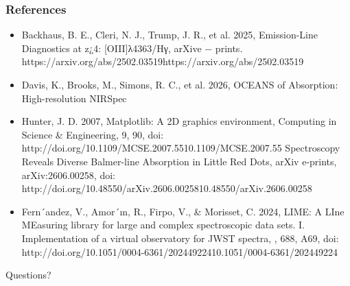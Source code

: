 \documentclass{beamer}
\begin{document}
\begin{frame}
    \frametitle{References}
    \begin{itemize}
    \item Backhaus, B. E., Cleri, N. J., Trump, J. R., et al. 2025,
Emission-Line Diagnostics at z¿4: [OIII]λ4363/Hγ, arXive −
prints. https://arxiv.org/abs/2502.03519https://arxiv.org/abs/2502.03519
    \item Davis, K., Brooks, M., Simons, R. C., et al. 2026, OCEANS of Absorption: High-resolution NIRSpec
    \item Hunter, J. D. 2007, Matplotlib: A 2D graphics environment, Computing in Science & Engineering, 9, 90, doi: http://doi.org/10.1109/MCSE.2007.5510.1109/MCSE.2007.55
Spectroscopy Reveals Diverse Balmer-line Absorption in Little Red Dots, arXiv e-prints, arXiv:2606.00258, doi: http://doi.org/10.48550/arXiv.2606.0025810.48550/arXiv.2606.00258
    \item Fern´andez, V., Amor´ın, R., Firpo, V., & Morisset, C. 2024, LIME: A LIne MEasuring library for large and complex spectroscopic data sets. I. Implementation of a virtual observatory for JWST spectra, , 688, A69, doi: http://doi.org/10.1051/0004-6361/20244922410.1051/0004-6361/202449224
    \end{itemize}
\end{frame}

\begin{frame}
    \begin{center}
        \Huge{Questions?}
    \end{center}
\end{frame}
\end{document}
